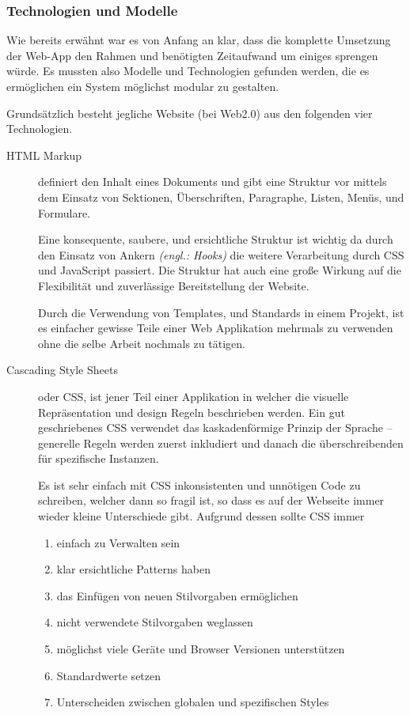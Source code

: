 \subsubsection{Technologien und Modelle}

Wie bereits erwähnt war es von Anfang an klar, dass die komplette Umsetzung der Web-App den Rahmen und benötigten Zeitaufwand um einiges sprengen würde. Es mussten also Modelle und Technologien gefunden werden, die es ermöglichen ein System möglichst modular zu gestalten.

Grundsätzlich besteht jegliche Website (bei Web2.0) aus den folgenden vier Technologien.

\begin{description}
\item[HTML Markup\newline] definiert den Inhalt eines Dokuments und gibt eine Struktur vor mittels dem Einsatz von Sektionen, Überschriften, Paragraphe, Listen, Menüs, und Formulare.

Eine konsequente, saubere, und ersichtliche Struktur ist wichtig da durch den Einsatz von Ankern \textit{(engl.: Hooks)} die weitere Verarbeitung durch CSS und JavaScript passiert. Die Struktur hat auch eine große Wirkung auf die Flexibilität und zuverlässige Bereitstellung der Website.

Durch die Verwendung von Templates, und Standards in einem Projekt, ist es einfacher gewisse Teile einer Web Applikation mehrmals zu verwenden ohne die selbe Arbeit nochmals zu tätigen.

\item[Cascading Style Sheets\newline] oder CSS, ist jener Teil einer Applikation in welcher die visuelle Repräsentation und design Regeln beschrieben werden. Ein gut geschriebenes CSS verwendet das kaskadenförmige Prinzip der Sprache – generelle Regeln werden zuerst inkludiert und danach die überschreibenden für spezifische Instanzen.

Es ist sehr einfach mit CSS inkonsistenten und unnötigen Code zu schreiben, welcher dann so fragil ist, so dass es auf der Webseite immer wieder kleine Unterschiede gibt. Aufgrund dessen sollte CSS immer 
\begin{enumerate}
\item einfach zu Verwalten sein
\item klar ersichtliche Patterns haben
\item das Einfügen von neuen Stilvorgaben ermöglichen
\item nicht verwendete Stilvorgaben weglassen
\item möglichst viele Geräte und Browser Versionen unterstützen
\item Standardwerte setzen
\item Unterscheiden zwischen globalen und spezifischen Styles
\end{enumerate}


\end{description}
